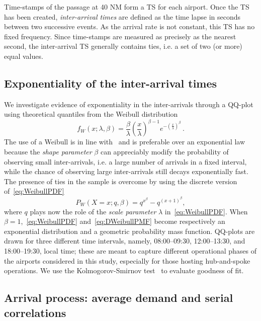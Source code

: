 \documentclass[final,review]{elsarticle}
\makeatletter
\newcommand*{\ie}{i.e.\@\xspace}
\makeatother
\begin{document}
Time-stamps of the passage at 40 NM form a \ac{TS} for each airport.
Once the \ac{TS} has been created, \emph{inter-arrival times} are defined as the time lapse in seconds between two successive events. As the arrival rate is not constant, this \ac{TS} has no fixed frequency.
Since time-stamps are measured as precisely as the nearest second, the inter-arrival \ac{TS} generally contains ties, \ie{} a set of two (or more) equal values.

\subsection{Exponentiality of the inter-arrival times}\label{sec:dm_exp}

We investigate evidence of exponentiality in the inter-arrivals through a QQ-plot using theoretical quantiles from the Weibull distribution
\begin{equation}
    f_W(x; \lambda, \beta) = \frac{\beta}{\lambda} \left(\frac{x}{\lambda}\right)^{\beta-1} e^{-(\frac{x}{\lambda})^\beta} \,.
    \label{eq:WeibullPDF}
\end{equation}
The use of a Weibull is in line with~\citet{willemain2004statistical} and is preferable over an exponential law because the \emph{shape parameter} \(\beta\) can appreciably modify the probability of observing small inter-arrivals, \ie{} a large number of arrivals in a fixed interval, while the chance of observing large inter-arrivals still decays exponentially fast.
The presence of ties in the sample is overcome by using the discrete version of~\eqref{eq:WeibullPDF}~\citep{nakagawa1975discrete,barbiero2013discrete}
\begin{equation}
    P_W(X=x;q,\beta) = q^{x^\beta} - q^{(x+1)^\beta},
    \label{eq:DWeibullPMF}
\end{equation}
where \(q\) plays now the role of the \emph{scale parameter} \(\lambda\) in~\eqref{eq:WeibullPDF}.
When \(\beta = 1\),~\eqref{eq:WeibullPDF} and~\eqref{eq:DWeibullPMF} become respectively an exponential distribution and a geometric probability mass function.
QQ-plots are drawn for three different time intervals, namely, 08:00--09:30, 12:00--13:30, and 18:00--19:30, local time; these are meant to capture different operational phases of the airports considered in this study, especially for those hosting hub-and-spoke operations.
We use the Kolmogorov-Smirnov test~\citep{taylor2011nonparam} to evaluate goodness of fit.

\subsection{Arrival process: average demand and serial correlations}\label{sec:dm_serial_corr}
\end{document}
